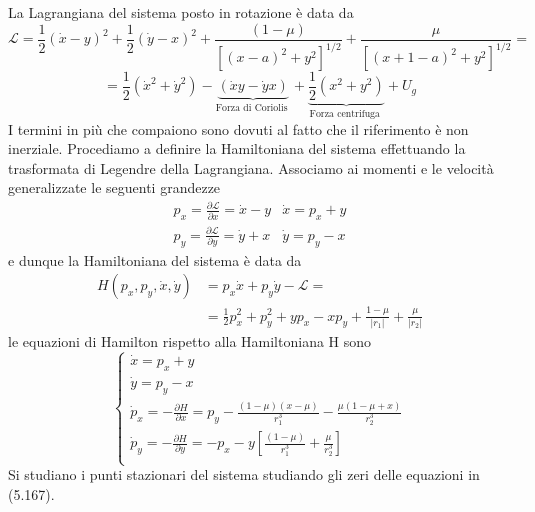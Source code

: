 La Lagrangiana del sistema posto in rotazione \`{e} data da 
\begin{equation*}
	\mathcal{L} = \frac{1}{2}(\dot{x}-y)^2+\frac{1}{2}(\dot{y}-x)^2 + \frac{(1-\mu)}{\left[(x-a)^2+y^2\right]^{1 / 2}}+\frac{ \mu}{\left[(x+1-a)^2+y^2\right]^{1 / 2}} = 
\end{equation*}
\begin{equation}
	=\frac{1}{2}\left(\dot{x}^2+\dot{y}^2\right)-\underbrace{(\dot{x} y-\dot{y} x)}_{\text {Forza di Coriolis }}+\underbrace{\frac{1}{2}\left(x^2+y^2\right)}_{\text {Forza centrifuga }}+U_{g}
\end{equation}
I termini in pi\`{u} che compaiono sono dovuti al fatto che il riferimento \`{e} non inerziale. Procediamo a definire la Hamiltoniana del sistema effettuando la trasformata di Legendre della Lagrangiana. Associamo ai momenti e le velocit\`{a} generalizzate le seguenti grandezze
\begin{equation}
\begin{array}{ll}
p_x=\frac{\partial \mathcal{L}}{\partial x}=\dot{x}-y & \dot{x}= p_x+y \\
p_y=\frac{\partial \mathcal{L}}{\partial y}=\dot{y}+x & \dot{y}= p_y-x
\end{array}
\end{equation}
e dunque la Hamiltoniana del sistema \`{e} data da 
\begin{equation}
\begin{aligned}
H(p_x, p_y,\dot{x},\dot{y}) & =p_x \dot{x}+p_y \dot{y}-\mathcal{L}= \\[0.1in]
& =\frac{1}{2} p_x^2+p_y^2+y p_x-x p_y+\frac{1-\mu}{\left|r_1\right|}+\frac{\mu}{\left|r_2\right|}
\end{aligned}
\end{equation}
le equazioni di Hamilton rispetto alla Hamiltoniana H sono 
\begin{equation}
\left\{\begin{array}{l}
\dot{x}=p_x+y \\
\dot{y}=p_y-x \\
\dot{p}_x=-\frac{\partial H}{\partial x}= 
p_y-\frac{(1-\mu)(x-\mu)}{r_1^3}-\frac{\mu(1-\mu+x)}{r_2^3}\\
\dot{p}_y=-\frac{\partial H}{\partial y}= 
-p_x-y\left[\frac{(1-\mu)}{r_1^3}+\frac{\mu}{r_2^3}\right]\\
\end{array}\right.
\end{equation}
\newline
Si studiano i punti stazionari del sistema studiando gli zeri delle equazioni in (5.167).

